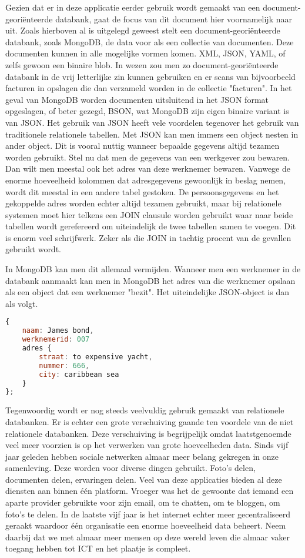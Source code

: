 \documentclass[a4paper,11pt]{article}
\begin{document}
Gezien dat er in deze applicatie eerder gebruik wordt gemaakt van een document-georiënteerde databank, gaat de focus van dit document hier voornamelijk naar uit. Zoals hierboven al is uitgelegd geweest stelt een document-georiënteerde databank, zoals MongoDB, de data voor als een collectie van documenten. Deze documenten kunnen in alle mogelijke vormen komen. XML, JSON, YAML, of zelfs gewoon een binaire blob. In wezen zou men zo document-georiënteerde databank in de vrij letterlijke zin kunnen gebruiken en er scans van bijvoorbeeld facturen in opslagen die dan verzameld worden in de collectie "facturen". In het geval van MongoDB worden documenten uitsluitend in het JSON format opgeslagen, of beter gezegd, BSON, wat MongoDB zijn eigen binaire variant is van JSON. Het gebruik van JSON heeft vele voordelen tegenover het gebruik van traditionele relationele tabellen.  Met JSON kan men immers een object nesten in ander object. Dit is vooral nuttig wanneer bepaalde gegevens altijd tezamen worden gebruikt. Stel nu dat men de gegevens van een werkgever zou bewaren. Dan wilt men meestal ook het adres van deze werknemer bewaren. Vanwege de enorme hoeveelheid kolommen dat adresgegevens gewoonlijk in beslag nemen, wordt dit meestal in een andere tabel gestoken. De persoonsgegevens en het gekoppelde adres worden echter altijd tezamen gebruikt, maar bij relationele systemen moet hier telkens een JOIN clausule worden gebruikt waar naar beide tabellen wordt gerefereerd om uiteindelijk de twee tabellen samen te voegen. Dit is enorm veel schrijfwerk. Zeker als die JOIN in tachtig procent van de gevallen gebruikt wordt.

In MongoDB kan men dit allemaal vermijden. Wanneer men een werknemer in de databank aanmaakt kan men in MongoDB het adres van die werknemer opslaan als een object dat een werknemer "bezit". Het uiteindelijke JSON-object is dan als volgt.

\begin{lstlisting}[language=javascript]
{
	naam: James bond,
	werknemerid: 007
	adres {
		straat: to expensive yacht,
		nummer: 666,
		city: caribbean sea
	}
};
\end{lstlisting}

Tegenwoordig wordt er nog steeds veelvuldig gebruik gemaakt van relationele databanken. Er is echter een grote verschuiving gaande ten voordele van de niet relationele databanken. Deze verschuiving is begrijpelijk omdat laatstgenoemde veel meer voorzien is op het verwerken van grote hoeveelheden data. Sinds vijf jaar geleden hebben sociale netwerken almaar meer belang gekregen in onze samenleving. Deze worden voor diverse dingen gebruikt. Foto's delen, documenten delen, ervaringen delen. Veel van deze applicaties bieden al deze diensten aan binnen één platform. Vroeger was het de gewoonte dat iemand een aparte provider gebruikte voor zijn email, om te chatten, om te bloggen, om foto's te delen. In de laatste vijf jaar is het internet echter meer gecentraliseerd geraakt waardoor één organisatie een enorme hoeveelheid data beheert. Neem daarbij dat we met almaar meer mensen op deze wereld leven die almaar vaker toegang hebben tot ICT en het plaatje is compleet.
\end{document}
